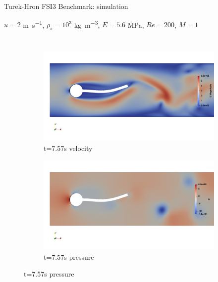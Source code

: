 \documentclass[10pt,t]{beamer}
\begin{document}

\begin{frame}{Turek-Hron FSI3 Benchmark: simulation}

$u=2$ \si{m.s^{-1}}, $\rho_s=10^3$ \si{kg.m^{-3}}, $E= 5.6$ \si{MPa}, $Re=200$, $M=1$

\begin{columns}


\begin{figure}[htb]
\centering %
\begin{subfigure}{0.5\textwidth}
  \includegraphics[width=\linewidth, trim=0 120 0 120, clip]{images/FSI3/fsi3_v1.png}
  \caption{t=7.57s velocity}
  \label{fig:fsi3_v1}
\end{subfigure}\hfil %
\begin{subfigure}{0.5\textwidth}
  \includegraphics[width=\linewidth, trim=0 120 0 120, clip]{images/FSI3/fsi3_p1.png}
  \caption{t=7.57s pressure}
  \label{fig:fsi3_p1}
\end{subfigure}\hfil %


\end{figure}
\end{columns}
\end{frame}
\end{document}
